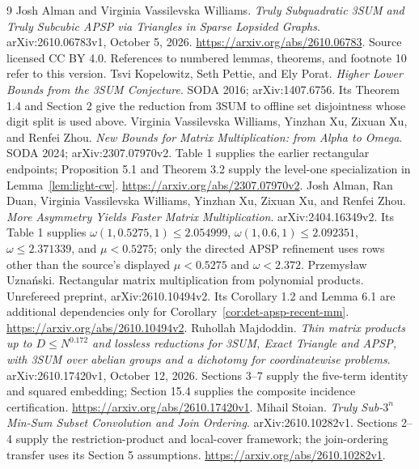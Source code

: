 \documentclass[11pt]{article}
\begin{document}
\begin{thebibliography}{9}
 Josh Alman and Virginia Vassilevska Williams.
\emph{Truly Subquadratic 3SUM and Truly Subcubic APSP via Triangles in Sparse
Lopsided Graphs}. arXiv:2610.06783v1, October 5, 2026.
\url{https://arxiv.org/abs/2610.06783}.
Source licensed CC BY 4.0. References to numbered lemmas, theorems,
and footnote 10 refer to this version.
 Tsvi Kopelowitz, Seth Pettie, and Ely Porat.
\emph{Higher Lower Bounds from the 3SUM Conjecture}. SODA 2016;
arXiv:1407.6756. Its Theorem 1.4 and Section 2 give the reduction from 3SUM
to offline set disjointness whose digit split is used above.
 Virginia Vassilevska Williams, Yinzhan Xu, Zixuan Xu,
and Renfei Zhou. \emph{New Bounds for Matrix Multiplication: from Alpha to Omega}.
SODA 2024; arXiv:2307.07970v2. Table 1 supplies the earlier rectangular
endpoints; Proposition 5.1 and Theorem 3.2 supply the level-one
specialization in Lemma~\ref{lem:light-cw}.
\url{https://arxiv.org/abs/2307.07970v2}.
 Josh Alman, Ran Duan, Virginia Vassilevska Williams,
Yinzhan Xu, Zixuan Xu, and Renfei Zhou. \emph{More Asymmetry Yields Faster
Matrix Multiplication}. arXiv:2404.16349v2. Its Table 1 supplies
$\omega(1,0.5275,1)\le2.054999$, $\omega(1,0.6,1)\le2.092351$,
$\omega\le2.371339$, and $\mu<0.5275$; only the directed APSP refinement
uses rows other than the source's displayed $\mu<0.5275$ and $\omega<2.372$.
 Przemys\l aw Uzna\'nski. Rectangular matrix multiplication
from polynomial products. Unrefereed preprint, arXiv:2610.10494v2. Its
Corollary 1.2 and Lemma 6.1 are additional dependencies only for
Corollary~\ref{cor:det-apsp-recent-mm}.
\url{https://arxiv.org/abs/2610.10494v2}.
 Ruhollah Majdoddin.
\emph{Thin matrix products up to $D\le N^{0.172}$ and lossless reductions
for 3SUM, Exact Triangle and APSP, with 3SUM over abelian groups and a
dichotomy for coordinatewise problems}. arXiv:2610.17420v1, October 12, 2026.
Sections 3--7 supply the five-term identity and squared embedding;
Section 15.4 supplies the composite incidence certification.
\url{https://arxiv.org/abs/2610.17420v1}.
 Mihail Stoian.
\emph{Truly Sub-$3^n$ Min-Sum Subset Convolution and Join Ordering}.
arXiv:2610.10282v1. Sections 2--4 supply the restriction-product and
local-cover framework; the join-ordering transfer uses its Section 5
assumptions.
\url{https://arxiv.org/abs/2610.10282v1}.
\end{thebibliography}
\end{document}
